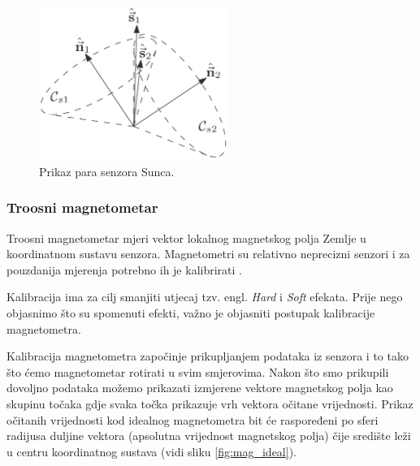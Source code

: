 \documentclass[times, utf8, diplomski, numeric]{templates/template}
\begin{document}
{{{{                \begin{figure}[htb]
                \centering
                \includegraphics[width=0.55\textwidth]{images/sensor_sunca_sensor_fusion.png}
                \caption{Prikaz para senzora Sunca.}
                \label{fig:sensor_sunca_sensor_fusion}
                \end{figure}
            }

            \subsubsection{Troosni magnetometar}{
            \label{subsubsection:troosni_magnetometar}
                Troosni magnetometar mjeri vektor lokalnog magnetskog polja Zemlje u koordinatnom sustavu senzora. Magnetometri su relativno neprecizni senzori i za pouzdanija mjerenja potrebno ih je kalibrirati \cite{adcsKnjiga}.

                Kalibracija ima za cilj smanjiti utjecaj tzv. engl. \emph{Hard} i \emph{Soft} efekata. Prije nego objasnimo što su spomenuti efekti, važno je objasniti postupak kalibracije magnetometra. 

                Kalibracija magnetometra započinje prikupljanjem podataka iz senzora i to tako što ćemo magnetometar rotirati u svim smjerovima. Nakon što smo prikupili dovoljno podataka možemo prikazati izmjerene vektore magnetskog polja kao skupinu točaka gdje svaka točka prikazuje vrh vektora očitane vrijednosti. Prikaz očitanih vrijednosti kod idealnog magnetometra bit će raspoređeni po sferi radijusa duljine vektora (apsolutna vrijednost magnetskog polja) čije središte leži u centru koordinatnog sustava (vidi sliku \ref{fig:mag_ideal}).

}}}}
\end{document}
